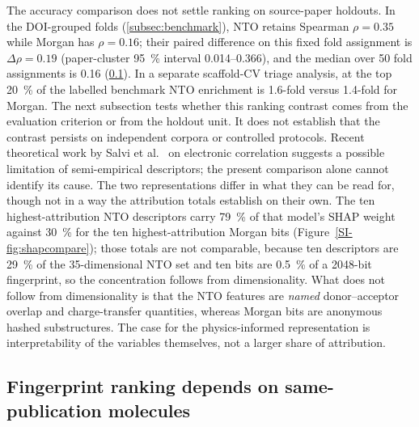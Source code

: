 The accuracy comparison does not settle ranking on source-paper holdouts. In the
DOI-grouped folds (\cref{subsec:benchmark}), NTO retains Spearman
$\rho = 0.35$ while Morgan has $\rho = 0.16$; their paired difference on this fixed
fold assignment is $\Delta\rho = 0.19$ (paper-cluster \qty{95}{\percent} interval
\numrange{0.014}{0.366}), and the median over \num{50} fold assignments is
\num{0.16} (\cref{subsec:holdout_unit}). In a separate scaffold-CV triage analysis, at the
top \qty{20}{\percent} of the labelled benchmark NTO enrichment is
\num{1.6}-fold versus \num{1.4}-fold for Morgan.
The next subsection tests whether this ranking contrast comes from the evaluation
criterion or from the holdout unit. It does not establish that the contrast persists on
independent corpora or controlled protocols.
Recent theoretical work by Salvi et al.~\cite{Salvi2025} on electronic correlation
suggests a possible limitation of semi-empirical descriptors; the present
comparison alone cannot identify its cause.
The two representations differ in what they can be read for, though not in a way the
attribution totals establish on their own. The ten highest-attribution NTO descriptors
carry \qty{79}{\percent} of that model's SHAP weight against \qty{30}{\percent} for the
ten highest-attribution Morgan bits (Figure~\ref{SI-fig:shapcompare}); those totals are not
comparable, because ten descriptors are \qty{29}{\percent} of the \num{35}-dimensional
NTO set and ten bits are \qty{0.5}{\percent} of a \num{2048}-bit fingerprint, so the
concentration follows from dimensionality. What does not follow from dimensionality is
that the NTO features are \emph{named} donor--acceptor overlap and charge-transfer
quantities, whereas Morgan bits are anonymous hashed substructures. The case for the
physics-informed representation is interpretability of the variables themselves, not a
larger share of attribution.

\subsection{Fingerprint ranking depends on same-publication molecules}\label{subsec:holdout_unit}

